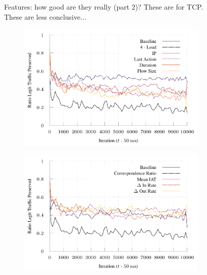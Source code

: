 \documentclass[conference, letterpaper, 10pt, times]{IEEEtran}
\begin{document}
\begin{figure}
	\caption{
		Features: how good are they really (part 2)? These are for TCP. These are less conclusive...
		\label{fig:tcp-feature-plots}
	}
\end{figure}

\begin{figure}
	\begin{subfigure}{0.32\linewidth}
		\includegraphics[width=\linewidth]{../plots/ftprep-tcp-cap-good}
	\end{subfigure}
	\begin{subfigure}{0.32\linewidth}
		\includegraphics[width=\linewidth]{../plots/ftprep-tcp-cap-good-2}
	\end{subfigure}
	\begin{subfigure}{0.32\linewidth}

\end{subfigure}
\end{figure}
\end{document}
